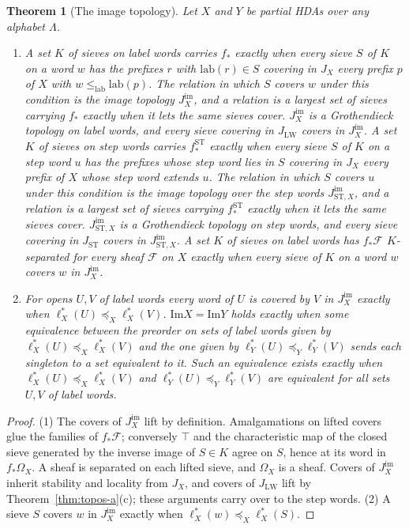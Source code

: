 \documentclass{lmcs}
\newtheorem{theorem}{Theorem}[section]
\theoremstyle{definition}
\theoremstyle{remark}
\newcommand{\JLW}{J_{\LW}}
\newcommand{\JX}[1]{J_{#1}}
\newcommand{\fle}[1]{\preceq_{#1}}
\newcommand{\lab}{\mathrm{lab}}
\newcommand{\lle}{\leq_{\mathrm{lab}}}
\newcommand{\LW}{\mathrm{LW}}
\providecommand{\lab}{\mathrm{lab}}
\providecommand{\JSW}{J_{\mathrm{ST}}}
\providecommand{\JimS}[1]{J^{\mathrm{im}}_{\mathrm{ST},#1}}
\providecommand{\lst}[1]{\ell^{*}_{#1}}
\providecommand{\fsh}{f_{\ast}}
\providecommand{\Ima}{\mathrm{Im}}
\providecommand{\Jim}[1]{J^{\mathrm{im}}_{#1}}
\providecommand{\fshS}{f^{\mathrm{ST}}_{\ast}}
\begin{document}
\begin{theorem}[The image topology]\label{thm:image-up}
Let $X$ and $Y$ be partial HDAs over any alphabet $\Lambda$.
\begin{enumerate}
\item A set $K$ of sieves on label words carries $\fsh$ exactly when every sieve $S$ of $K$ on a word $w$ has the
  prefixes $r$ with $\lab(r)\in S$ covering in $\JX{X}$ every prefix $p$ of $X$ with
  $w\lle\lab(p)$. The relation in which $S$ covers $w$ under this condition is the image
  topology $\Jim{X}$, and a relation is a largest set of sieves carrying $\fsh$ exactly when it
  lets the same sieves cover. $\Jim{X}$ is a Grothendieck topology on label
  words, and every sieve covering in $\JLW$ covers in
  $\Jim{X}$. A set $K$ of sieves on step words carries $\fshS$ exactly when every sieve
  $S$ of $K$ on a step word $u$ has the prefixes whose step word lies in $S$ covering in $\JX{X}$ every prefix of $X$
  whose step word extends $u$. The relation in which $S$ covers $u$ under this condition
  is the image topology over the step words $\JimS{X}$, and a relation is a largest set
  of sieves carrying $\fshS$ exactly when it lets the same sieves cover. $\JimS{X}$ is
  a Grothendieck topology on step words, and every sieve covering in $\JSW$ covers
  in $\JimS{X}$. A set $K$ of sieves on label words has $\fsh\mathscr{F}$ $K$-separated
  for every sheaf $\mathscr{F}$ on $X$ exactly when every sieve of $K$ on a word $w$ covers $w$ in
  $\Jim{X}$.
\item For opens $U,V$ of label words every word of $U$ is covered by $V$ in $\Jim{X}$ exactly when
  $\lst{X}(U)\fle{X}\lst{X}(V)$. $\Ima X=\Ima Y$ holds exactly when some equivalence
  between the preorder on sets of label words given by $\lst{X}(U)\fle{X}\lst{X}(V)$ and the one given by
  $\lst{Y}(U)\fle{Y}\lst{Y}(V)$ sends each singleton to a set equivalent to it.
  Such an equivalence exists exactly when $\lst{X}(U)\fle{X}\lst{X}(V)$ and $\lst{Y}(U)\fle{Y}\lst{Y}(V)$ are
  equivalent for all sets $U,V$ of label words.
\end{enumerate}
\end{theorem}

\begin{proof}
(1) The covers of $\Jim{X}$ lift by definition.
Amalgamations on lifted covers glue the families of $\fsh\mathscr{F}$; conversely $\top$
and the characteristic map of the closed sieve generated by the inverse image of $S\in K$ agree on $S$, hence at its
word in $\fsh\Omega_X$. A sheaf is
separated on each lifted sieve, and $\Omega_X$ is a
sheaf. Covers of
$\Jim{X}$ inherit stability and locality from $\JX{X}$, and covers of $\JLW$ lift by
Theorem~\ref{thm:topos-a}(c); these
arguments carry over to the step words.
(2) A sieve $S$ covers $w$ in $\Jim{X}$ exactly when
$\lst{X}(w)\fle{X}\lst{X}(S)$.
\end{proof}
\end{document}
